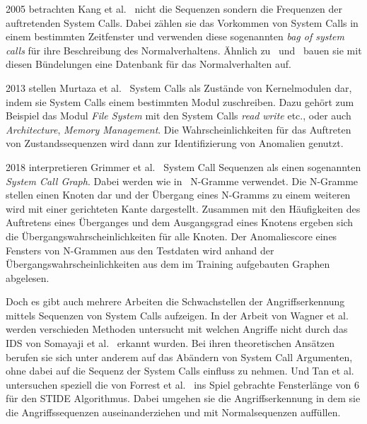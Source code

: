         2005 betrachten Kang et al.~\cite{FREQUENCY2} nicht die Sequenzen sondern die Frequenzen der auftretenden System Calls.
        Dabei zählen sie das Vorkommen von System Calls in einem bestimmten Zeitfenster und verwenden diese sogenannten \textit{bag of system calls} für ihre Beschreibung des Normalverhaltens.
        Ähnlich zu~\cite{FORREST} und~\cite{STIDE} bauen sie mit diesen Bündelungen eine Datenbank für das Normalverhalten auf.

        2013 stellen Murtaza et al.~\cite{SYSTEM_STATES} System Calls als Zustände von Kernelmodulen dar, indem sie System Calls einem bestimmten Modul zuschreiben.
        Dazu gehört zum Beispiel das Modul \textit{File System} mit den System Calls \textit{read} \textit{write} etc., oder auch \textit{Architecture}, \textit{Memory Management}.
        Die Wahrscheinlichkeiten für das Auftreten von Zustandssequenzen wird dann zur Identifizierung von Anomalien genutzt.

        2018 interpretieren Grimmer et al.~\cite{SYSCALL_GRAPHS} System Call Sequenzen als einen sogenannten \textit{System Call Graph}.
        Dabei werden wie in~\cite{STIDE_Alternatives} N-Gramme verwendet.
        Die N-Gramme stellen einen Knoten dar und der Übergang eines N-Gramms zu einem weiteren wird mit einer gerichteten Kante dargestellt.
        Zusammen mit den Häufigkeiten des Auftretens eines Überganges und dem Ausgangsgrad eines Knotens ergeben sich die Übergangswahrscheinlichkeiten für alle Knoten.
        Der Anomaliescore eines Fensters von N-Grammen aus den Testdaten wird anhand der Übergangswahrscheinlichkeiten aus dem im Training aufgebauten Graphen abgelesen.


    Doch es gibt auch mehrere Arbeiten die Schwachstellen der Angriffserkennung mittels Sequenzen von System Calls aufzeigen.
    In der Arbeit von Wagner et al.~\cite{Syscallseqexploit1} werden verschieden Methoden untersucht mit welchen Angriffe nicht durch das IDS von Somayaji et al.~\cite{FORREST2000} erkannt wurden.
    Bei ihren theoretischen Ansätzen berufen sie sich unter anderem auf das Abändern von System Call Argumenten, ohne dabei auf die Sequenz der System Calls einfluss zu nehmen.
    UndTan et al.~\cite{Syscallseqexploit3} untersuchen speziell die von Forrest et al.~\cite{FORREST} ins Spiel gebrachte Fensterlänge von $6$ für den \ac{STIDE} Algorithmus.
    Dabei umgehen sie die Angriffserkennung in dem sie die Angriffssequenzen auseinanderziehen und mit Normalsequenzen auffüllen.


